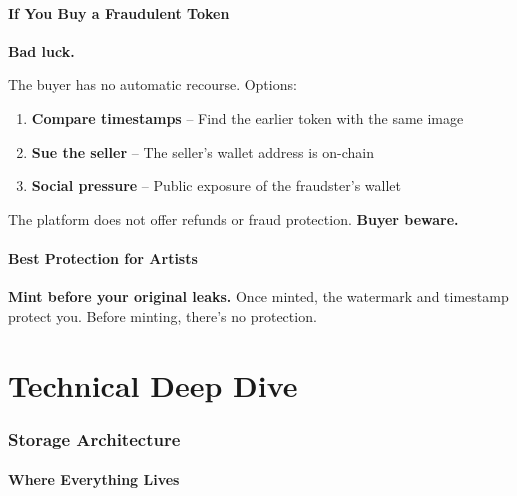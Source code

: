 \documentclass[11pt,a4paper]{article}
\begin{document}
\subsection{If You Buy a Fraudulent Token}

\textbf{Bad luck.}

The buyer has no automatic recourse. Options:

\begin{enumerate}
    \item \textbf{Compare timestamps} -- Find the earlier token with the same image
    \item \textbf{Sue the seller} -- The seller's wallet address is on-chain
    \item \textbf{Social pressure} -- Public exposure of the fraudster's wallet
\end{enumerate}

The platform does not offer refunds or fraud protection. \textbf{Buyer beware.}

\subsection{Best Protection for Artists}

\textbf{Mint before your original leaks.} Once minted, the watermark and timestamp protect you. Before minting, there's no protection.

\newpage
\part{Technical Deep Dive}

\section{Storage Architecture}

\subsection{Where Everything Lives}
\end{document}
